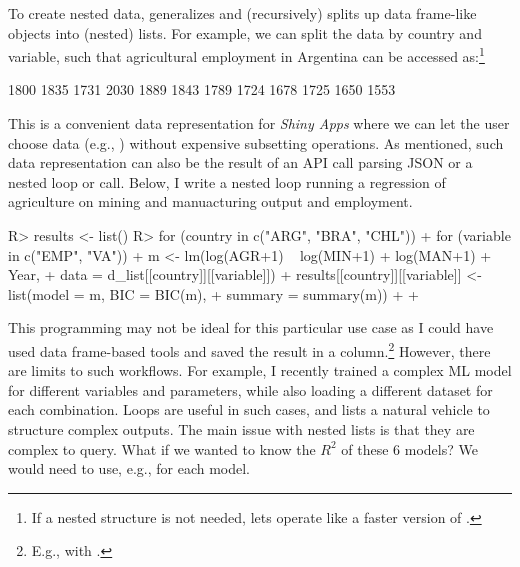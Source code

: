 \documentclass[nojss]{jss} %
\newcommand{\fct}[1]{\code{#1()}}
\begin{document}
To create nested data, \fct{rsplit} generalizes \fct{split} and (recursively) splits up data frame-like objects into (nested) lists. For example, we can split the  data by country and variable, such that agricultural employment in Argentina can be accessed as:\footnote{If a nested structure is not needed,  lets \fct{rsplit} operate like a faster version of \fct{split}.} \newpage
%
\begin{Schunk}
\begin{Soutput}
 [1] 1800 1835 1731 2030 1889 1843 1789 1724 1678 1725 1650 1553
\end{Soutput}
\end{Schunk}
%
This is a convenient data representation for \emph{Shiny Apps} where we can let the user choose data (e.g., ) without expensive subsetting operations. As mentioned, such data representation can also be the result of an API call parsing JSON or a nested loop or \fct{lapply} call. Below, I write a nested loop running a regression of agriculture on mining and manuacturing output and employment.
\begin{Schunk}
\begin{Sinput}
R> results <- list()
R> for (country in c("ARG", "BRA", "CHL")) {
+    for (variable in c("EMP", "VA")) {
+      m <- lm(log(AGR+1) ~ log(MIN+1) + log(MAN+1) + Year,
+              data = d_list[[country]][[variable]])
+      results[[country]][[variable]] <- list(model = m, BIC = BIC(m),
+                                             summary = summary(m))
+    }
+  }
\end{Sinput}
\end{Schunk}
This programming may not be ideal for this particular use case as I could have used data frame-based tools and saved the result in a column.\footnote{E.g.,  with .}
However, there are limits to such workflows. For example, I recently trained a complex ML model for different variables and parameters, while also loading a different dataset for each combination. Loops are useful in such cases, and lists a natural vehicle to structure complex outputs. The main issue with nested lists is that they are complex to query. What if we wanted to know the $R^2$ of these 6 models? We would need to use, e.g.,  for each model.\newline
\end{document}
